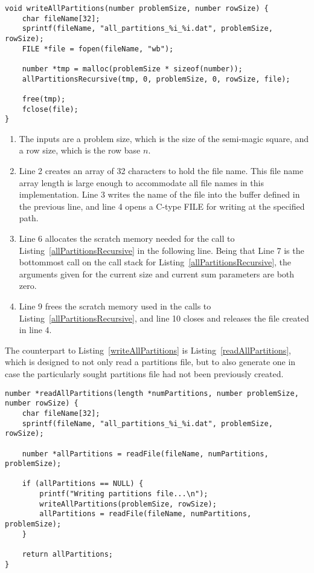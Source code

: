 \begin{lstlisting}[caption={Writing all partitions to a file.},label={writeAllPartitions}]
void writeAllPartitions(number problemSize, number rowSize) {
    char fileName[32];
    sprintf(fileName, "all_partitions_%i_%i.dat", problemSize, rowSize);
    FILE *file = fopen(fileName, "wb");

    number *tmp = malloc(problemSize * sizeof(number));
    allPartitionsRecursive(tmp, 0, problemSize, 0, rowSize, file);

    free(tmp);
    fclose(file);
}
\end{lstlisting}

\begin{enumerate}
\item The inputs are a problem size, which is the size of the semi-magic square, and a row size, which is the row base $n$.
\item Line 2 creates an array of 32 characters to hold the file name. This file name array length is large enough to accommodate all file names in this implementation. Line 3 writes the name of the file into the buffer defined in the previous line, and line 4 opens a C-type FILE for writing at the specified path.
\addtocounter{enumi}{3}
\item Line 6 allocates the scratch memory needed for the call to Listing~\ref{allPartitionsRecursive} in the following line. Being that Line 7 is the bottommost call on the call stack for Listing~\ref{allPartitionsRecursive}, the arguments given for the current size and current sum parameters are both zero.
\addtocounter{enumi}{2}
\item Line 9 frees the scratch memory used in the calls to Listing~\ref{allPartitionsRecursive}, and line 10 closes and releases the file created in line 4.
\end{enumerate}

The counterpart to Listing~\ref{writeAllPartitions} is Listing~\ref{readAllPartitions}, which is designed to not only read a partitions file, but to also generate one in case the particularly sought partitions file had not been previously created.

\begin{lstlisting}[caption={Reading all partitions from a file.},label={readAllPartitions}]
number *readAllPartitions(length *numPartitions, number problemSize, number rowSize) {
    char fileName[32];
    sprintf(fileName, "all_partitions_%i_%i.dat", problemSize, rowSize);

    number *allPartitions = readFile(fileName, numPartitions, problemSize);

    if (allPartitions == NULL) {
        printf("Writing partitions file...\n");
        writeAllPartitions(problemSize, rowSize);
        allPartitions = readFile(fileName, numPartitions, problemSize);
    }

    return allPartitions;
}
\end{lstlisting}

